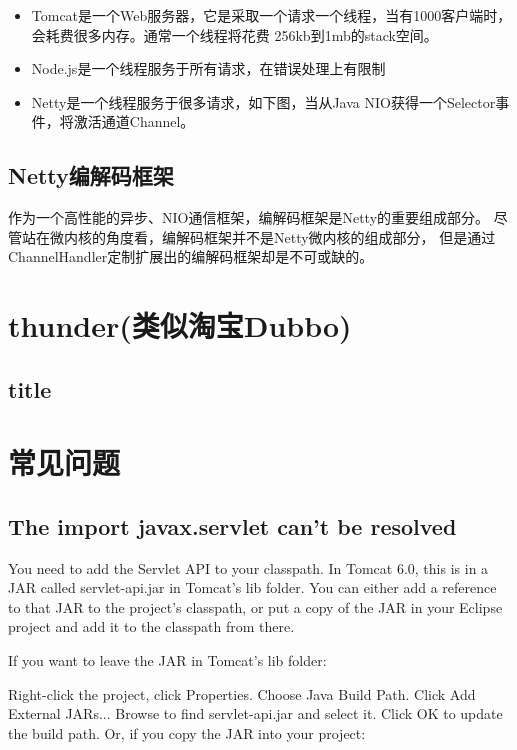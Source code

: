 \documentclass{book}
\begin{document}
\begin{itemize}
	\item{Tomcat是一个Web服务器，它是采取一个请求一个线程，当有1000客户端时，会耗费很多内存。通常一个线程将花费 256kb到1mb的stack空间。}
	\item{Node.js是一个线程服务于所有请求，在错误处理上有限制}
	\item{Netty是一个线程服务于很多请求，如下图，当从Java NIO获得一个Selector事件，将激活通道Channel。}
\end{itemize}

\subsection{Netty编解码框架}

作为一个高性能的异步、NIO通信框架，编解码框架是Netty的重要组成部分。
尽管站在微内核的角度看，编解码框架并不是Netty微内核的组成部分，
但是通过ChannelHandler定制扩展出的编解码框架却是不可或缺的。

\section{thunder(类似淘宝Dubbo)}

\subsection{title}




\section{常见问题}

\subsection{The import javax.servlet can't be resolved}

You need to add the Servlet API to your classpath. 
In Tomcat 6.0, this is in a JAR called servlet-api.jar in Tomcat's lib folder. 
You can either add a reference to that JAR to the project's classpath, 
or put a copy of the JAR in your Eclipse project and add it to the classpath from there.

If you want to leave the JAR in Tomcat's lib folder:

Right-click the project, click Properties.
Choose Java Build Path.
Click Add External JARs...
Browse to find servlet-api.jar and select it.
Click OK to update the build path.
Or, if you copy the JAR into your project:
\end{document}
